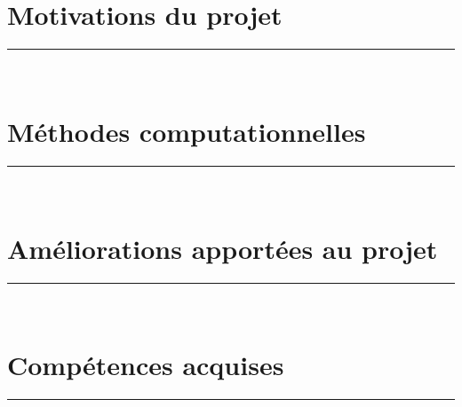 \setcounter{myfigure}{1}
\renewcommand{\caption}[1]{
  \vspace{0.25cm}
  \begin{quote}
    {{\sc Figure} \arabic{myfigure}: #1}
  \end{quote}
  \vspace{.5cm}
  \stepcounter{myfigure}
}%
%

%
\renewcommand{\titlesize}{\Huge}%
\title{\Title}


\author{
{\FirstNameA\ \AuthorA\ } 
{\FirstNameB\ \AuthorB\ }
}

\institute{
{\InstituteA }
{\InstituteB }
}           

\conference{\Conference}
 
\maketitle

\begin{multicols}{3}

\section*{Motivations du projet}
\rule[40ex]{\linewidth}{3pt}\\
\ParagMotiv
\vfill
\columnbreak

\section*{Méthodes computationnelles}
\rule[40ex]{\linewidth}{3pt}\\
\ParagMethComp
\columnbreak

\section*{Améliorations apportées au projet}
\rule[40ex]{\linewidth}{3pt}\\
\ParagAmelio

\section*{Compétences acquises}
\rule[40ex]{\linewidth}{3pt}\\
\ParagCompAcqu

\end{multicols}

